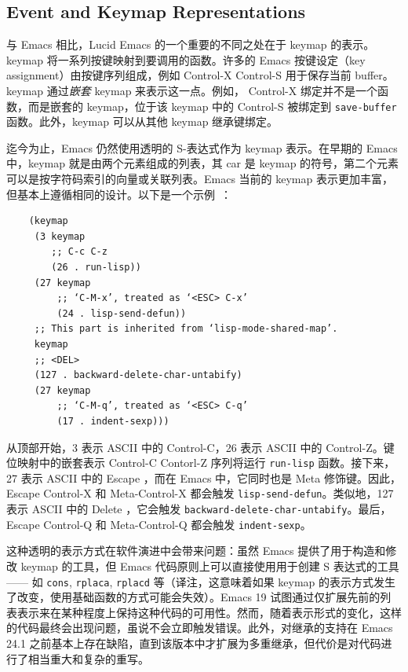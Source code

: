 \documentclass[format=acmsmall,screen]{acmart}
\begin{document}
\subsection{Event and Keymap Representations}
\label{sec:keymaps}

与 Emacs 相比，Lucid Emacs 的一个重要的不同之处在于 keymap 的表示。keymap 将一系列按键映射到要调用的函数。许多的 Emacs 按键设定（key assignment）由按键序列组成，例如 Control-X Control-S 用于保存当前 buffer。keymap 通过\emph{嵌套} keymap 来表示这一点。例如， Control-X 绑定并不是一个函数，而是嵌套的 keymap，位于该 keymap 中的 Control-S 被绑定到 \texttt{save-buffer} 函数。此外，keymap 可以从其他 keymap 继承键绑定。

迄今为止，Emacs 仍然使用透明的 S-表达式作为 keymap 表示。在早期的 Emacs 中，keymap 就是由两个元素组成的列表，其 car 是 keymap 的符号，第二个元素可以是按字符码索引的向量或关联列表。Emacs 当前的 keymap 表示更加丰富，但基本上遵循相同的设计。以下是一个示例~\cite{ELispManual2018}：
\begin{verbatim}
    (keymap
     (3 keymap
        ;; C-c C-z
        (26 . run-lisp))
     (27 keymap
         ;; ‘C-M-x’, treated as ‘<ESC> C-x’
         (24 . lisp-send-defun))
     ;; This part is inherited from ‘lisp-mode-shared-map’.
     keymap
     ;; <DEL>
     (127 . backward-delete-char-untabify)
     (27 keymap
         ;; ‘C-M-q’, treated as ‘<ESC> C-q’
         (17 . indent-sexp)))
\end{verbatim}
从顶部开始，3 表示 ASCII 中的 Control-C，26 表示 ASCII 中的 Control-Z。键位映射中的嵌套表示 Control-C Contorl-Z 序列将运行 \texttt{run-lisp} 函数。接下来，27 表示 ASCII 中的 Escape ，而在 Emacs 中，它同时也是 Meta 修饰键。因此， Escape Control-X 和 Meta-Control-X 都会触发 \texttt{lisp-send-defun}。类似地，127 表示 ASCII 中的 Delete ，它会触发 \texttt{backward-delete-char-untabify}。最后， Escape Control-Q 和 Meta-Control-Q 都会触发 \texttt{indent-sexp}。

这种透明的表示方式在软件演进中会带来问题：虽然 Emacs 提供了用于构造和修改 keymap 的工具，但 Emacs 代码原则上可以直接使用用于创建 S 表达式的工具 —— 如 \texttt{cons}, \texttt{rplaca}, \texttt{rplacd} 等（译注，这意味着如果 keymap 的表示方式发生了改变，使用基础函数的方式可能会失效）。Emacs 19 试图通过仅扩展先前的列表表示来在某种程度上保持这种代码的可用性。然而，随着表示形式的变化，这样的代码最终会出现问题，虽说不会立即触发错误。此外，对继承的支持在 Emacs 24.1 之前基本上存在缺陷，直到该版本中才扩展为多重继承，但代价是对代码进行了相当重大和复杂的重写。
\end{document}
